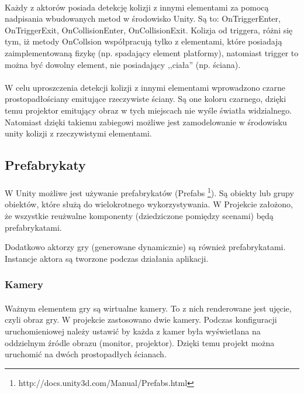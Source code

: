 \paragraph{}
Każdy z aktorów posiada detekcję kolizji z innymi elementami za pomocą nadpisania wbudowanych metod w środowisko Unity. Są to: OnTriggerEnter, OnTriggerExit, OnCollisionEnter, OnCollisionExit. Kolizja od triggera, różni się tym, iż metody OnCollsion współpracują tylko z elementami, które posiadają zaimplementowaną fizykę (np. spadający element platformy), natomiast trigger to można być dowolny element, nie posiadający ,,ciała'' (np. ściana).

\paragraph{}
W celu uproszczenia detekcji kolizji z innymi elementami wprowadzono czarne prostopadłościany emitujące rzeczywiste ściany. Są one koloru czarnego, dzięki temu projektor emitujący obraz w tych miejscach nie wyśle światła widzialnego. Natomiast dzięki takiemu zabiegowi możliwe jest zamodelowanie w środowisku unity kolizji z rzeczywistymi elementami.

\subsection{Prefabrykaty}
\paragraph{}
W Unity możliwe jest używanie prefabrykatów (Prefabs \footnote{http://docs.unity3d.com/Manual/Prefabs.html}). Są obiekty lub grupy obiektów, które służą do wielokrotnego wykorzystywania. W Projekcie założono, że wszystkie reużwalne komponenty (dziedziczone pomiędzy scenami) będą prefabrykatami.

Dodatkowo aktorzy gry (generowane dynamicznie) są również prefabrykatami. Instancje aktora są tworzone podczas działania aplikacji.

\subsubsection{Kamery}
\paragraph{}
Ważnym elementem gry są wirtualne kamery. To z nich renderowane jest ujęcie, czyli obraz gry. W projekcie zastosowano dwie kamery. Podczas konfiguracji uruchomieniowej należy ustawić by każda z kamer była wyświetlana na oddzielnym źródle obrazu (monitor, projektor). Dzięki temu projekt można uruchomić na dwóch prostopadłych ścianach.
